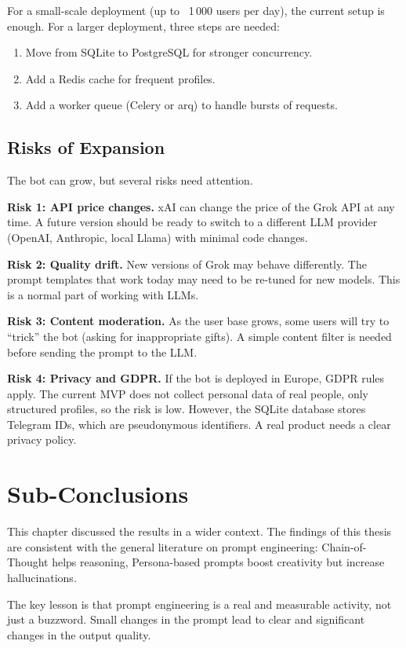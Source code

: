 For a small-scale deployment (up to ~1\,000 users per day), the current setup is enough. For a larger deployment, three steps are needed:
\begin{enumerate}
    \item Move from SQLite to PostgreSQL for stronger concurrency.
    \item Add a Redis cache for frequent profiles.
    \item Add a worker queue (Celery or arq) to handle bursts of requests.
\end{enumerate}

\subsection{Risks of Expansion}

The bot can grow, but several risks need attention.

\textbf{Risk 1: API price changes.} xAI can change the price of the Grok API at any time. A future version should be ready to switch to a different LLM provider (OpenAI, Anthropic, local Llama) with minimal code changes.

\textbf{Risk 2: Quality drift.} New versions of Grok may behave differently. The prompt templates that work today may need to be re-tuned for new models. This is a normal part of working with LLMs.

\textbf{Risk 3: Content moderation.} As the user base grows, some users will try to ``trick'' the bot (asking for inappropriate gifts). A simple content filter is needed before sending the prompt to the LLM.

\textbf{Risk 4: Privacy and GDPR.} If the bot is deployed in Europe, GDPR rules apply. The current MVP does not collect personal data of real people, only structured profiles, so the risk is low. However, the SQLite database stores Telegram IDs, which are pseudonymous identifiers. A real product needs a clear privacy policy.

\section{Sub-Conclusions}
\label{sec:ch4-summary}

This chapter discussed the results in a wider context. The findings of this thesis are consistent with the general literature on prompt engineering: Chain-of-Thought helps reasoning, Persona-based prompts boost creativity but increase hallucinations.

The key lesson is that prompt engineering is a real and measurable activity, not just a buzzword. Small changes in the prompt lead to clear and significant changes in the output quality.

